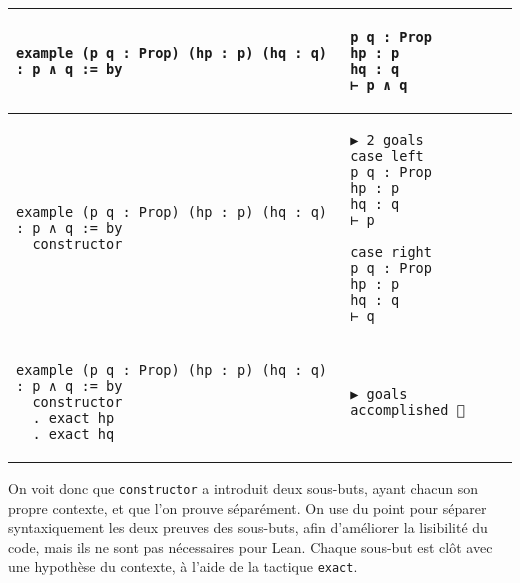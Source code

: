 \documentclass[a4paper, 12pt]{article}
\newcommand{\lean}[1]{\texttt{#1}}
\begin{document}
\begin{tabular}{m{} | m{}}
    \begin{minipage}[t]{0.5\textwidth}
    \begin{verbatim}
example (p q : Prop) (hp : p) (hq : q) : p ∧ q := by
    \end{verbatim}
    \end{minipage}
    &
    \begin{minipage}[t]{0.5\textwidth}
    \begin{verbatim}
p q : Prop
hp : p
hq : q
⊢ p ∧ q
    \end{verbatim}
    \end{minipage}
    \\\hline

    \begin{minipage}{0.5\textwidth}
    \begin{verbatim}
example (p q : Prop) (hp : p) (hq : q) : p ∧ q := by
  constructor
    \end{verbatim}
    \end{minipage}
    &
    \begin{minipage}[t]{0.5\textwidth}
    \begin{verbatim}
▶ 2 goals
case left
p q : Prop
hp : p
hq : q
⊢ p

case right
p q : Prop
hp : p
hq : q
⊢ q
    \end{verbatim}
    \end{minipage}
    \\\hline
    \begin{minipage}[t]{0.5\textwidth}
    \begin{verbatim}
example (p q : Prop) (hp : p) (hq : q) : p ∧ q := by
  constructor
  . exact hp
  . exact hq
    \end{verbatim}
    \end{minipage}
    &
    \begin{minipage}[t]{0.5\textwidth}
    \begin{verbatim}
▶ goals accomplished 🎉
    \end{verbatim}
    \end{minipage}
\end{tabular}
\vspace{\baselineskip}

On voit donc que \lean{constructor} a introduit deux sous-buts, ayant chacun son propre contexte, et que l'on prouve séparément. On use du point pour séparer syntaxiquement les deux preuves des sous-buts, afin d'améliorer la lisibilité du code, mais ils ne sont pas nécessaires pour Lean. Chaque sous-but est clôt avec une hypothèse du contexte, à l'aide de la tactique \lean{exact}.
\end{document}
